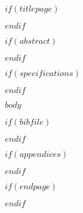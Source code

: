 \documentclass[
    $if(papersize)$
        $papersize$,
    $else$
        a4paper,
    $endif$
    $if(fontsize)$
        $fontsize$,
    $else$
        11pt,
    $endif$
    $for(classoption)$$classoption$,$endfor$
    onecolumn,
    titlepage,
    french,
]{$if(documentclass)$$documentclass$$else$report$endif$}
\begin{document}

    $if(titlepage)$
    \label{titlepage}
    
    \cleardoublepage
    $endif$


    $if(abstract)$
    \begin{abstract}
        \thispagestyle{plain}
        
    \end{abstract}
    \cleardoublepage
    $endif$



    $if(specifications)$
        
        \cleardoublepage
    $endif$



    \sffamily
    \label{tableofcontents}
    \setcounter{tocdepth}{2}
    \tableofcontents
    \normalfont

    \cleardoublepage




    $body$



    $if(bibfile)$
        
        
    $endif$


    $if(appendices)$
        \clearpage
        \begin{appendices}
        \end{appendices}
    $endif$


    $if(endpage)$
        \newpage
        \thispagestyle{empty}
        
    $endif$
\end{document}
